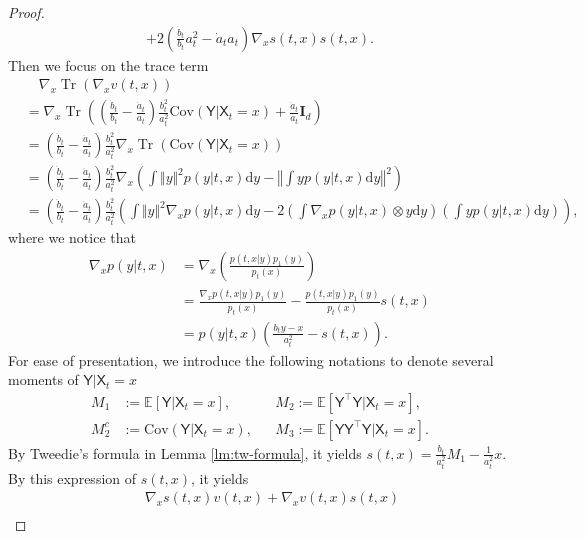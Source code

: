 \documentclass[twoside,11pt]{article}
\def\rmI{{\mathbf{I}}}
\newcommand{\E}{\mathbb{E}}
\newcommand{\Cov}{\mathrm{Cov}}
\DeclareMathOperator{\Tr}{Tr}
\newcommand{\diff}{\mathrm{d}}
\numberwithin{equation}{section}
\begin{document}
\begin{proof}
\begin{align*}
       + 2 \left( \frac{\dot{b}_t}{b_t} a_t^2 - \dot{a}_t a_t \right) \nabla_x s(t, x) s(t, x).
\end{align*}
Then we focus on the trace term
\begin{align*}
    & \quad \nabla_x \Tr(\nabla_x v(t, x)) \\
    &= \nabla_x \Tr \left( \left( \frac{\dot{b}_t}{b_t} - \frac{\dot{a}_t}{a_t} \right) \frac{b_t^2}{a_t^2} \Cov (\mathsf{Y} | \mathsf{X}_t = x) + \frac{\dot{a}_t} {a_t} \rmI_d \right) \\
    &= \left( \frac{\dot{b}_t}{b_t} - \frac{\dot{a}_t}{a_t} \right) \frac{b_t^2}{a_t^2} \nabla_x \Tr( \Cov (\mathsf{Y} | \mathsf{X}_t = x) ) \\
    &= \left( \frac{\dot{b}_t}{b_t} - \frac{\dot{a}_t}{a_t} \right) \frac{b_t^2}{a_t^2} \nabla_x \left( \int \Vert y \Vert^2 p(y | t, x) \diff y - \left\Vert \int y p(y | t, x) \diff y \right\Vert^2 \right) \\
    &= \left( \frac{\dot{b}_t}{b_t} - \frac{\dot{a}_t}{a_t} \right) \frac{b_t^2}{a_t^2} \left( \int \Vert y \Vert^2 \nabla_x p(y | t, x) \diff y - 2 \left( \int \nabla_x p(y | t, x) \otimes y \diff y \right) \left( \int y p(y | t, x) \diff y \right) \right),
\end{align*}
where we notice that
\begin{align*}
    \nabla_x p(y | t, x)
    &= \nabla_x \left( \frac{p(t, x | y) p_1(y)}{p_t(x)} \right) \\
    &= \frac{\nabla_x p(t, x | y) p_1(y)} {p_t(x)} - \frac{p(t, x | y) p_1(y)}{p_t(x)} s(t, x) \\
    &= p(y | t, x) \left( \frac{b_t y - x}{a_t^2} - s(t, x) \right).
\end{align*}
For ease of presentation, we introduce the following notations to denote several moments of $\mathsf{Y} | \mathsf{X}_t = x$
\begin{align*}
    M_1 &:= \E [\mathsf{Y} | \mathsf{X}_t = x],       && M_2 := \E [\mathsf{Y}^{\top} \mathsf{Y} | \mathsf{X}_t = x], \\
    M^c_2 &:= \Cov(\mathsf{Y} | \mathsf{X}_t = x),    && M_3 := \E [\mathsf{Y} \mathsf{Y}^{\top} \mathsf{Y} | \mathsf{X}_t = x].
\end{align*}
By Tweedie's formula in Lemma \ref{lm:tw-formula}, it yields $s(t, x) = \frac{b_t}{a_t^2} M_1 - \frac{1}{a_t^2} x$.
By this expression of $s(t, x)$, it yields
\begin{align*}
    & \quad \nabla_x s(t, x) v(t, x) + \nabla_x v(t, x) s(t, x) \\

\end{align*}
\end{proof}
\end{document}
